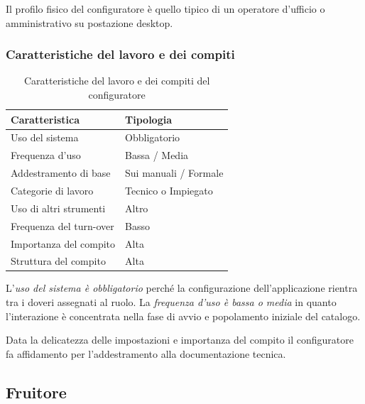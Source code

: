 Il profilo fisico del configuratore è quello tipico di un operatore d'ufficio o amministrativo su postazione desktop.

\subsubsection{Caratteristiche del lavoro e dei compiti}
\begin{table}[H]
    \centering
    \begin{tabular}{@{}>{\raggedright\arraybackslash}p{6cm}>{\raggedright\arraybackslash}p{6cm}@{}}
        \toprule
        \textbf{Caratteristica}          & \textbf{Tipologia}                       \\ \midrule
        Uso del sistema                  & Obbligatorio                             \\
        Frequenza d'uso                  & Bassa / Media                            \\
        Addestramento di base            & Sui manuali / Formale                    \\
        Categorie di lavoro              & Tecnico o Impiegato    \\
        Uso di altri strumenti           & Altro \\
        Frequenza del turn-over          & Basso                                    \\
        Importanza del compito           & Alta                                     \\
        Struttura del compito            & Alta                                     \\ \bottomrule
    \end{tabular}
    \caption{Caratteristiche del lavoro e dei compiti del configuratore}
\end{table}

L'\emph{uso del sistema è obbligatorio} perché la configurazione dell'applicazione rientra tra i doveri assegnati al ruolo. La \emph{frequenza d'uso è bassa o media} in quanto l'interazione è concentrata nella fase di avvio e popolamento iniziale del catalogo.

Data la delicatezza delle impostazioni e importanza del compito il configuratore fa affidamento per l'addestramento alla documentazione tecnica.

\subsection{Fruitore}
